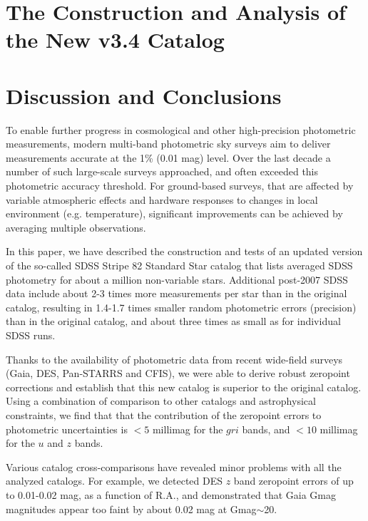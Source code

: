 \documentclass{aastex63}
\begin{document}
 
\section{The Construction and Analysis of the New v3.4 Catalog \label{sec:v34}}

\section{Discussion and Conclusions} \label{sec:disc}

To enable further progress in cosmological and other high-precision photometric measurements, 
modern multi-band photometric sky surveys aim to deliver measurements accurate at the 1\% 
(0.01 mag) level. Over the last decade a number of such large-scale surveys approached, and
often exceeded this photometric accuracy threshold. For ground-based surveys, that are 
affected by variable atmospheric effects and hardware responses to changes in local environment
(e.g. temperature), significant improvements can be achieved by averaging multiple observations. 

In this paper, we have described the construction and tests of an updated version of the so-called
SDSS Stripe 82 Standard Star catalog \citep{Ivez07} that lists averaged SDSS photometry for about
a million non-variable stars. Additional post-2007 SDSS data include about 
2-3 times more measurements per star than in the original catalog, resulting in 1.4-1.7 times smaller 
random photometric errors (precision) than in the original catalog, and about three times as small 
as for individual SDSS runs.

Thanks to the availability of photometric data from recent wide-field surveys (Gaia, DES, Pan-STARRS
and CFIS), we were able to derive robust zeropoint corrections and establish that this new catalog
is superior to the original catalog. Using a combination of comparison to other catalogs and 
astrophysical constraints, we find that that the contribution of the zeropoint errors to photometric
uncertainties is $<5$ millimag for the $gri$ bands, and $<10$ millimag for the $u$ and $z$ bands. 

Various catalog cross-comparisons have revealed minor problems with all the analyzed catalogs.
For example, we detected DES $z$ band zeropoint errors of up to 0.01-0.02 mag, as a function 
of R.A., and demonstrated that Gaia Gmag magnitudes appear too faint by about 0.02 mag at
Gmag$\sim$20.
 
\end{document}
